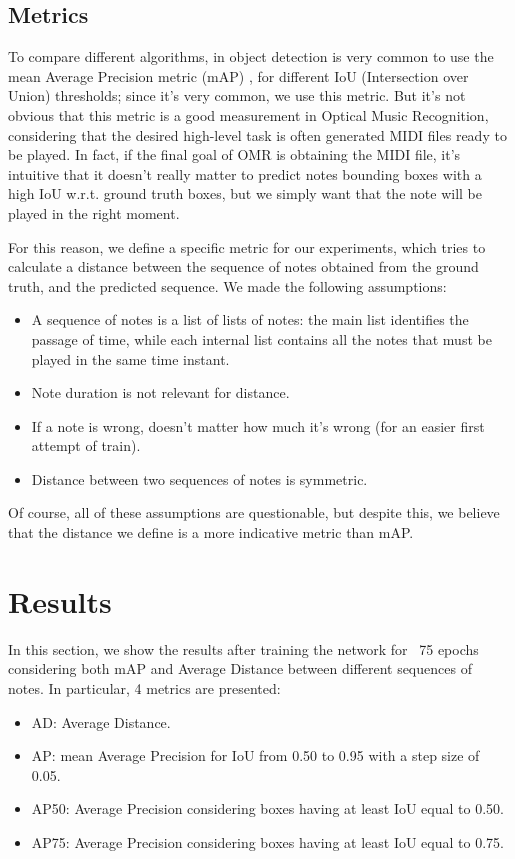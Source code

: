 \documentclass[journal]{IEEEtran}
\begin{document}
	\subsection{Metrics}
	To compare different algorithms, in object detection is very common to use the mean Average Precision metric (mAP) \cite{mAP-article}, for different IoU (Intersection over Union) thresholds; since it's very common, we use this metric. But it's not obvious that this metric is a good measurement in Optical Music Recognition, considering that the desired high-level task is often generated MIDI files ready to be played. In fact, if the final goal of OMR is obtaining the MIDI file, it's intuitive that it doesn't really matter to predict notes bounding boxes with a high IoU w.r.t. ground truth boxes, but we simply want that the note will be played in the right moment.
	
	For this reason, we define a specific metric for our experiments, which tries to calculate a distance between the sequence of notes obtained from the ground truth, and the predicted sequence. We made the following assumptions:
	\begin{itemize}
		\item A sequence of notes is a list of lists of notes: the main list identifies the passage of time, while each internal list contains all the notes that must be played in the same time instant.
		\item Note duration is not relevant for distance.
		\item If a note is wrong, doesn't matter how much it's wrong (for an easier first attempt of train).
		\item Distance between two sequences of notes is symmetric.
	\end{itemize}
	
	Of course, all of these assumptions are questionable, but despite this, we believe that the distance we define is a more indicative metric than mAP.

	\section{Results}
	In this section, we show the results after training the network for ~75 epochs considering both mAP and Average Distance between different sequences of notes. In particular, 4 metrics are presented:
	\begin{itemize}
		\item AD: Average Distance.
		\item AP: mean Average Precision for IoU from 0.50 to 0.95 with a step size of 0.05.
		\item AP50: Average Precision considering boxes having at least IoU equal to 0.50.
		\item AP75: Average Precision considering boxes having at least IoU equal to 0.75.
	\end{itemize}
\end{document}
